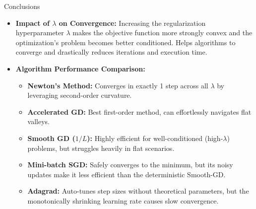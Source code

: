 \documentclass[10pt]{beamer}
\begin{document}
\begin{frame}{Conclusions}
    \vspace{0.2cm}
    \begin{itemize}
        \item \textbf{Impact of $\lambda$ on Convergence:}
        Increasing the regularization hyperparameter $\lambda$ makes the objective function more strongly convex and the optimization's problem becomes better conditioned. Helps algorithms to converge and drastically reduces iterations and execution time.

        \vspace{0.4cm}
        \item \textbf{Algorithm Performance Comparison:}\\
        \vspace{0.1cm}
        \begin{itemize}
            \item \textbf{Newton's Method:} Converges in exactly 1 step across all $\lambda$ by leveraging second-order curvature.
            \item \textbf{Accelerated GD:} Best first-order method, can effortlessly navigates flat valleys.
            \item \textbf{Smooth GD ($1/L$):} Highly efficient for well-conditioned (high-$\lambda$) problems, but struggles heavily in flat scenarios.
            \item \textbf{Mini-batch SGD:} Safely converges to the minimum, but its noisy updates make it less efficient than the deterministic Smooth-GD.
            \item \textbf{Adagrad:} Auto-tunes step sizes without theoretical parameters, but the monotonically shrinking learning rate causes slow convergence.
        \end{itemize}
    \end{itemize}
\end{frame}
\end{document}
